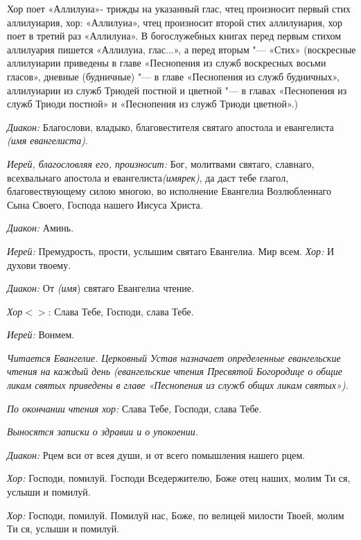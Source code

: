 \medskip Хор поет «Аллилуиа»- трижды на указанный глас, чтец произносит первый стих аллилуиария, хор: «Аллилуиа», чтец произносит второй стих аллилуиария, хор поет в третий раз «Аллилуиа». В богослужебных книгах перед первым стихом аллилуария пишется «Аллилуиа, глас...», а перед вторым "--- «Стих» (воскресные аллилуиарии приведены в главе «Песнопения из служб воскресных восьми гласов», дневные (будничные) "--- в главе «Песнопения из служб будничных», аллилуиарии из служб Триодей постной и цветной "--- в главах «Песнопения из служб Триоди постной» и «Песнопения из служб Триоди цветной».)

 {\itshape Диакон:} Благослови, владыко, благовестителя святаго апостола и евангелиста {\itshape (имя евангелиста)}.

 {\itshape Иерей, благословляя его, произносит:} Бог, молитвами святаго, славнаго, всехвальнаго апостола и евангелиста{\itshape  (имярек)}, да даст тебе глагол, благовествующему силою многою, во исполнение Евангелиа Возлюбленнаго Сына Своего, Господа нашего Иисуса Христа.

 {\itshape Диакон:} Аминь.

 {\itshape Иерей:} Премудрость, прости, услышим святаго Евангелиа. Мир всем. {\itshape Хор:} И духови твоему.

 {\itshape Диакон:} От {\itshape (имя}) святаго Евангелиа чтение.

 {\itshape Хор$<$}$>$: Слава Тебе, Господи, слава Тебе.

 {\itshape Иерей:} Вонмем. 


 {\itshape Читается Евангелие. Церковный Устав назначает определенные евангельские чтения на каждый день (евангельские чтения Пресвятой Богородице о общие ликам святых приведены в главе «Песнопения из служб общих ликам святых»).}

 {\itshape По окончании чтения хор:} Слава Тебе, Господи, слава Тебе.

 {\itshape Выносятся записки о здравии и о упокоении.} 


 {\itshape Диакон:} Рцем вси от всея души, и от всего помышления нашего рцем.

 {\itshape  Хор:} Господи, помилуй. Господи Вседержителю, Боже отец наших, молим Ти ся, услыши и помилуй.

 {\itshape  Хор:} Господи, помилуй. Помилуй нас, Боже, по велицей милости Твоей, молим Ти ся, услыши и помилуй.


